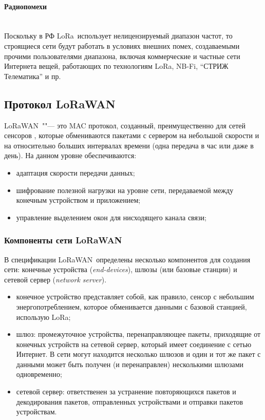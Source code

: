 \paragraph{Радиопомехи} \hspace{0pt}\\

Поскольку в РФ LoRa\texttrademark~использует нелицензируемый диапазон частот, 
то строящиеся 
сети будут работать в условиях внешних помех, создаваемыми прочими 
пользователями диапазона, включая коммерческие и частные сети Интернета вещей, 
работающих по технологиям LoRa\texttrademark, NB-Fi, ``СТРИЖ Телематика'' и пр.

\subsection{Протокол LoRaWAN\texttrademark}

LoRaWAN\texttrademark~""--- это MAC протокол, созданный, преимущественно для 
сетей сенсоров \cite{augustin2016, lavric2017internet}, которые обмениваются 
пакетами с сервером на небольшой скорости и на относительно больших интервалах 
времени (одна передача в час или даже в день).
На данном уровне обеспечиваются:
\begin{itemize}
 \item адаптация скорости передачи данных;
 \item шифрование полезной нагрузки на уровне сети, передаваемой между конечным 
устройством и приложением;
 \item управление выделением окон для нисходящего канала связи;
\end{itemize}


\subsubsection{Компоненты сети LoRaWAN\texttrademark}

В спецификации LoRaWAN\texttrademark~определены несколько компонентов для 
создания сети: конечные устройства (\textit{end-devices}), шлюзы (или базовые 
станции) и сетевой сервер (\textit{network server}).
\begin{itemize}
 \item конечное устройство представляет собой, как правило, сенсор с небольшим 
энергопотреблением, которое обменивается данными с базовой станцией, использую 
LoRa\texttrademark;
 \item шлюз: промежуточное устройства, перенаправляющее пакеты, приходящие от 
конечных устройств на сетевой сервер, который имеет соединение с сетью 
Интернет. 
В сети могут находится несколько шлюзов и один и тот же пакет с данными может 
быть получен (и перенаправлен) несколькими шлюзами одновременно;
 \item сетевой сервер: ответственен за устранение повторяющихся пакетов и 
декодирования пакетов, отправленных устройствами и отправки пакетов устройствам.
\end{itemize}

